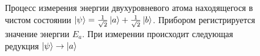 \begin{figure}
\centering



\caption{Процесс измерения энергии двухуровневого атома находящегося в
чистом состоянии $\left|\psi\right> = 
\frac{1}{\sqrt{2}}\ket{a} + \frac{1}{\sqrt{2}}\ket{b}$.
Прибором регистрируется значение энергии $E_a$. При измерении
происходит следующая редукция $\left|\psi\right> \to \ket{a}$
}
\label{fig:add:mesure_ex_a}
\end{figure}
